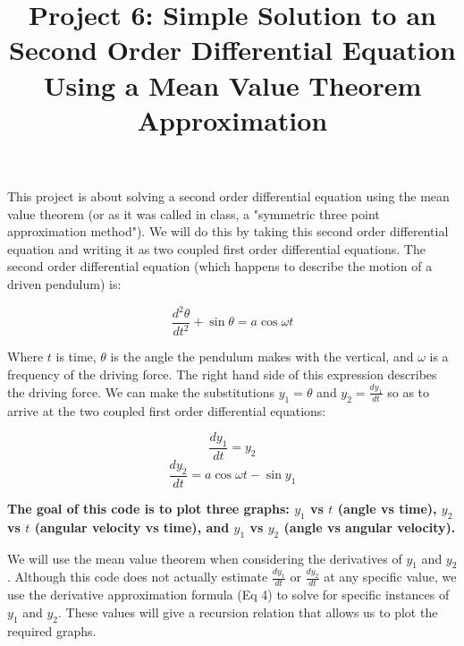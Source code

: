 \documentclass[11pt]{amsart}
\title{Project 6: Simple Solution to an Second Order Differential Equation Using a Mean Value Theorem Approximation}
\begin{document}
\maketitle

This project is about solving a second order differential equation using the mean value theorem (or as it was called in class, a "symmetric three point approximation method").  We will do this by taking this second order differential equation and writing it as two coupled first order differential equations.  The second order differential equation (which happens to describe the motion of a driven pendulum) is:

\begin{equation}
\frac{d^{2} \theta}{d t^{2}} + \sin{\theta} = a \cos{\omega t}
\end{equation}
\vspace{2 mm}

Where $t$ is time, $\theta$ is the angle the pendulum makes with the vertical, and $\omega$ is a frequency of the driving force.  The right hand side of this expression describes the driving force.  We can make the substitutions $y_1 = \theta$ and $y_2 = \frac{d y_1}{d t}$ so as to arrive at the two coupled first order differential equations:

\begin{equation}
\frac{d y_1}{dt} = y_2
\end{equation}
\begin{equation}
\frac{d y_2}{dt} = a \cos{\omega t}- \sin{y_1}
\end{equation}
\vspace{2 mm}

\textbf{The goal of this code is to plot three graphs: $y_1$ vs $t$ (angle vs time), $y_2$ vs $t$ (angular velocity vs time), and $y_1$ vs $y_2$ (angle vs angular velocity).}
\newline

We will use the mean value theorem when considering the derivatives of $y_1$ and $y_2$.  Although this code does not actually estimate $\frac{d y_1}{dt}$ or $\frac{d y_2}{dt}$ at any specific value, we use the derivative approximation formula (Eq 4) to solve for specific instances of $y_1$ and $y_2$.  These values will give a recursion relation that allows us to plot the required graphs.
\newline
\end{document}
